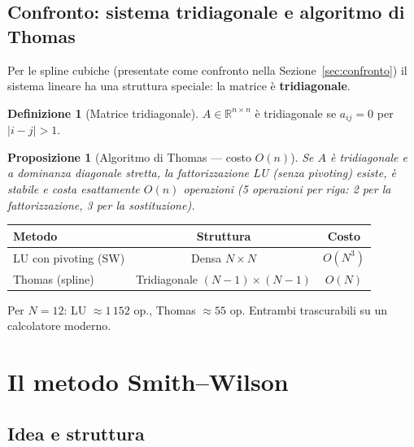 \documentclass[11pt,a4paper]{article}
\theoremstyle{plain}
\newtheorem{proposizione}[teorema]{Proposizione}
\theoremstyle{definition}
\newtheorem{definizione}[teorema]{Definizione}
\theoremstyle{remark}
\newcommand{\R}{\mathbb{R}}
\begin{document}
\subsection{Confronto: sistema tridiagonale e algoritmo di Thomas}
\label{sec:thomas}

Per le spline cubiche (presentate come confronto nella Sezione~\ref{sec:confronto})
il sistema lineare ha una struttura speciale: la matrice \`e \textbf{tridiagonale}.

\begin{definizione}[Matrice tridiagonale]
$A \in \R^{n\times n}$ \`e tridiagonale se $a_{ij} = 0$ per $|i-j|>1$.
\end{definizione}

\begin{proposizione}[Algoritmo di Thomas --- costo $O(n)$]
\label{prop:thomas}
Se $A$ \`e tridiagonale e a dominanza diagonale stretta, la fattorizzazione LU
(senza pivoting) esiste, \`e stabile e costa esattamente $O(n)$ operazioni
(5 operazioni per riga: 2 per la fattorizzazione, 3 per la sostituzione).
\end{proposizione}

\begin{keybox}
\begin{center}
\begin{tabular}{lcc}
\toprule
\textbf{Metodo} & \textbf{Struttura} & \textbf{Costo} \\
\midrule
LU con pivoting (SW) & Densa $N\times N$ & $O(N^3)$ \\
Thomas (spline) & Tridiagonale $(N{-}1)\times(N{-}1)$ & $O(N)$ \\
\bottomrule
\end{tabular}
\end{center}
Per $N=12$: LU $\approx 1\,152$ op., Thomas $\approx 55$ op.
Entrambi trascurabili su un calcolatore moderno.
\end{keybox}

\section{Il metodo Smith--Wilson}
\label{sec:sw}

\subsection{Idea e struttura}
\end{document}
